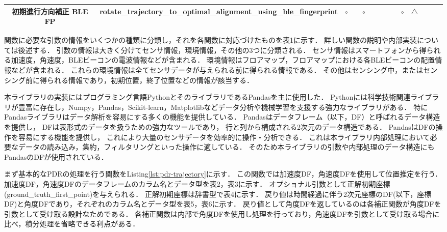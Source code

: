 \begin{table}[ht]
{\begin{tabular}{|c|c|c|c|c|c|c|c|c|c|c|c|c|c|}
			初期進行方向補正 BLE FP    & rotate\_trajectory\_to\_optimal\_alignment\_using\_ble\_fingerprint
			                   & \multicolumn{1}{c|}{$\circ$}                                        &                              & \multicolumn{1}{c|}{$\circ$} &                              &                              &                              &                                                                                                               & \multicolumn{1}{c|}{$\circ$} & \multicolumn{1}{c|}{$\triangle$} &                                  &    &                                   \\ \hline
		\end{tabular}
	}
\end{table}


関数に必要な引数の情報をいくつかの種類に分類し，それを各関数に対応づけたものを表1に示す．
詳しい関数の説明や内部実装については後述する．
引数の情報は大きく分けてセンサ情報，環境情報，その他の3つに分類される．
センサ情報はスマートフォンから得られる加速度，角速度，BLEビーコンの電波情報などが含まれる．
環境情報はフロアマップ，フロアマップにおける各BLEビーコンの配置情報などが含まれる．
これらの環境情報は全てセンサデータが与えられる前に得られる情報である．
その他はセンシング中，またはセンシング前に得られる情報であり，初期位置，終了位置などの情報が該当する．

本ライブラリの実装にはプログラミング言語PythonとそのライブラリであるPandasを主に使用した．
Pythonには科学技術関連ライブラリが豊富に存在し，Numpy，Pandas，Scikit-learn，Matplotlibなどデータ分析や機械学習を支援する強力なライブラリがある．
特にPandasライブラリはデータ解析を容易にする多くの機能を提供している．
Pandasはデータフレーム（以下，DF）と呼ばれるデータ構造を提供し，
DFは表形式のデータを扱うための強力なツールであり，
行と列から構成される2次元のデータ構造である．
PandasはDFの操作を容易にする機能を提供し，
これにより大量のセンサデータを効率的に操作・分析できる．
これは本ライブラリ内部処理において必要なデータの読み込み，集約，フィルタリングといった操作に適している．
そのため本ライブラリの引数や内部処理のデータ構造にもPandasのDFが使用されている．

まず基本的なPDRの処理を行う関数をListing\ref{lst:pdr-trajectory}に示す．
この関数では加速度DF，角速度DFを使用して位置推定を行う．
加速度DF，角速度DFのデータフレームのカラム名とデータ型を表2，表3に示す．
オプショナル引数として正解初期座標(ground\_truth\_first\_point)を与えられる．
正解初期座標は辞書型で表4に示す．
戻り値は時間経過に伴う2次元座標のDF(以下，座標DF)と角度DFであり，それぞれのカラム名とデータ型を表5，表6に示す．
戻り値として角度DFを返しているのは各補正関数が角度DFを引数として受け取る設計なためである．
各補正関数は内部で角度DFを使用し処理を行っており，角速度DFを引数として受け取る場合に比べ，積分処理を省略できる利点がある．

